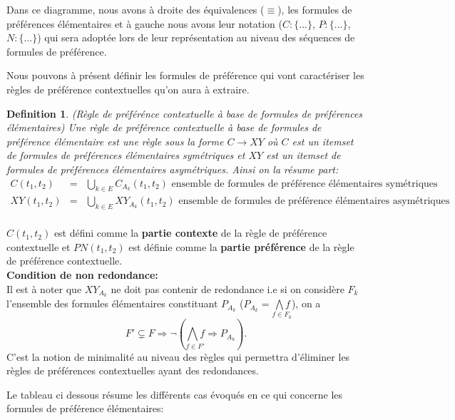 \documentclass[a4paper,12pt,openany,oneside]{article}
\newtheorem{defn}{Definition} %
\begin{document}
Dans ce diagramme, nous avons à droite des équivalences ($\equiv$), les formules de préférences élémentaires et à gauche nous avons leur notation ($C:\{...\}$, $P:\{...\}$,$N:\{...\}$) qui sera adoptée lors de leur représentation au niveau des séquences de formules de préférence.




Nous pouvons à présent définir les formules de préférence qui vont caractériser les règles de préférence contextuelles qu'on aura à extraire.
	\begin{defn}(Règle de préférénce contextuelle à base de formules de préférences élémentaires)
		Une règle de préférence contextuelle à base de formules de préférence élémentaire est une règle sous la forme $C\rightarrow XY$ où $C$ est un itemset de formules de préférences élémentaires symétriques et $XY$ est un itemset de formules de préférences élémentaires asymétriques. Ainsi on la résume part:
 	\[
 	\begin{array}{rcl}
 			C(t_{1},t_{2})&=&\underset{k\in E}{\bigcup} C_{A_{k}}(t_{1},t_{2}) \text{ ensemble de formules de préférence élémentaires symétriques}\\
 			XY(t_{1},t_{2})&=&\underset{k\in E}{\bigcup} XY_{A_{k}}(t_{1},t_{2})\text{ ensemble de formules de préférence élémentaires asymétriques}\\  	
	\end{array}
 	\]
 
 	\end{defn}
	$C(t_1,t_2)$ est défini comme  la \textbf{partie contexte}  de la règle de préférence contextuelle et $PN(t_1,t_2)$ est définie comme la \textbf{partie préférence} de la règle de préférence contextuelle.\\


       	\textbf{Condition de non redondance:}\\
       	Il est à noter que $XY_{A_{k}}$ ne doit pas contenir de redondance i.e si on considère $F_{k}$ l'ensemble des formules élémentaires constituant $P_{A_{k}}$ ($P_{A_{k}}=\underset{f\in F_{k}}{\bigwedge f}$), on a 
       	\[
       	 F'\subsetneq F\Rightarrow \neg (\underset{f\in F'}{\bigwedge f}\Rightarrow P_{A_{k}}).
       	\]
 	C'est la notion de minimalité au niveau des règles qui permettra d'éliminer les règles de préférences contextuelles ayant des redondances.


Le tableau ci dessous résume les différents cas évoqués en ce qui concerne les formules de préférence élémentaires:
 	 
\end{document}
